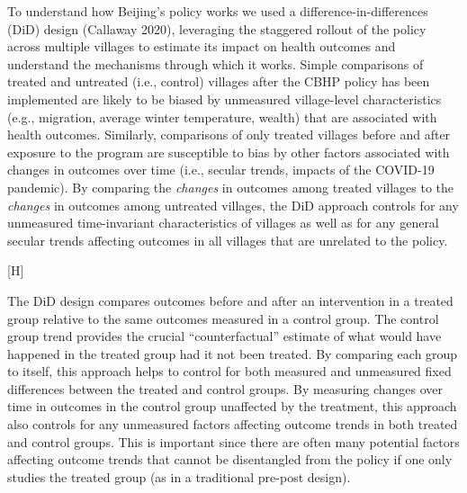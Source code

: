 \documentclass[
  letterpaper,
  DIV=11,
  numbers=noendperiod]{scrartcl}
\makeatletter
\renewenvironment{figure}%
   {\renewcommand\familydefault\sfdefault
    \@float{figure}}
   {\end@float}
\makeatother
\begin{document}
To understand how Beijing's policy works we used a
difference-in-differences (DiD) design (Callaway 2020), leveraging the
staggered rollout of the policy across multiple villages to estimate its
impact on health outcomes and understand the mechanisms through which it
works. Simple comparisons of treated and untreated (i.e., control)
villages after the CBHP policy has been implemented are likely to be
biased by unmeasured village-level characteristics (e.g., migration,
average winter temperature, wealth) that are associated with health
outcomes. Similarly, comparisons of only treated villages before and
after exposure to the program are susceptible to bias by other factors
associated with changes in outcomes over time (i.e., secular trends,
impacts of the COVID-19 pandemic). By comparing the \emph{changes} in
outcomes among treated villages to the \emph{changes} in outcomes among
untreated villages, the DiD approach controls for any unmeasured
time-invariant characteristics of villages as well as for any general
secular trends affecting outcomes in all villages that are unrelated to
the policy.

\begin{figure}[H]


\caption{\label{fig-didfig}Stylized example of
difference-in-differences}

\end{figure}%

The DiD design compares outcomes before and after an intervention in a
treated group relative to the same outcomes measured in a control group.
The control group trend provides the crucial ``counterfactual'' estimate
of what would have happened in the treated group had it not been
treated. By comparing each group to itself, this approach helps to
control for both measured and unmeasured fixed differences between the
treated and control groups. By measuring changes over time in outcomes
in the control group unaffected by the treatment, this approach also
controls for any unmeasured factors affecting outcome trends in both
treated and control groups. This is important since there are often many
potential factors affecting outcome trends that cannot be disentangled
from the policy if one only studies the treated group (as in a
traditional pre-post design).
\end{document}
